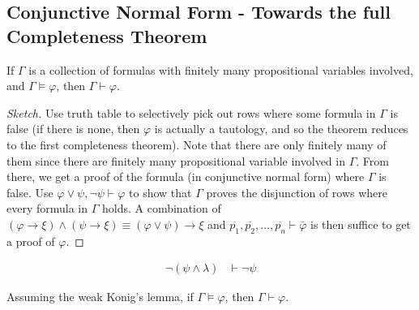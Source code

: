\documentclass{treatise}
\begin{document}
\begin{shaded}
\subsection{Conjunctive Normal Form - Towards the full Completeness Theorem}
\begin{corollary}
If $\Gamma$ is a collection of formulas with finitely many propositional variables involved, and $\Gamma \vDash \varphi$, then $\Gamma \vdash \varphi$.
\end{corollary}
\begin{proof}[Sketch]
Use truth table to selectively pick out rows where some formula in $\Gamma$ is false (if there is none, then $\varphi$ is actually a tautology, and so the theorem reduces to the first completeness theorem). Note that there are only finitely many of them since there are finitely many propositional variable involved in $\Gamma$. From there, we get a proof of the formula (in conjunctive normal form) where $\Gamma$ is false. Use $\varphi \vee \psi, \neg \psi \vdash \varphi$ to show that $\Gamma$ proves the disjunction of rows where every formula in $\Gamma$ holds. A combination of $(\varphi \to \xi) \wedge (\psi \to \xi) \equiv (\varphi \vee \psi) \to \xi$ and $\overline{p_1}, \overline{p_2}, \hdots, \overline{p_n} \vdash \overline{\varphi}$ is then suffice to get a proof of $\varphi$.
\end{proof}
\begin{lemma}
\begin{align*}
\neg (\psi \wedge \lambda) & \vdash \neg \psi
\end{align*}
\end{lemma}
\begin{corollary}
Assuming the weak Konig's lemma, if $\Gamma \vDash \varphi$, then $\Gamma \vdash \varphi$.
\end{corollary}

\newpage


\end{shaded}
\end{document}

